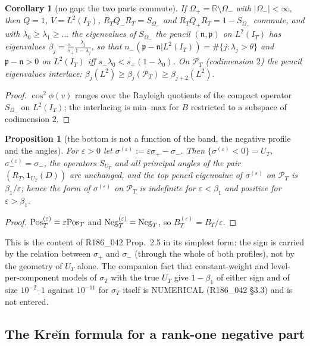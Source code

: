 \documentclass[11pt]{amsart}
\newtheorem{proposition}[theorem]{Proposition}
\newtheorem{corollary}[theorem]{Corollary}
\theoremstyle{definition}
\theoremstyle{remark}
\newcommand{\R}{\mathbb R}
\newcommand{\PT}{\mathcal P_T}
\newcommand{\IT}{I_T}
\newcommand{\sT}{\sigma_T}
\begin{document}
\begin{corollary}[no gap: the two parts commute]\label{cor:wh-nogap}
If $\Omega_+=\R\setminus\Omega_-$ with $|\Omega_-|<\infty$, then $Q=1$, $V=L^2(\IT)$, $R_TQ_-R_T=S_{\Omega_-}$ and
$R_TQ_+R_T=1-S_{\Omega_-}$ commute, and with $\lambda_0\ge\lambda_1\ge\dots$ the eigenvalues of $S_{\Omega_-}$ the pencil
$(\mathfrak n,\mathfrak p)$ on $L^2(\IT)$ has eigenvalues $\beta_j=\frac{s_-}{s_+}\frac{\lambda_j}{1-\lambda_j}$, so that
$n_-(\mathfrak p-\mathfrak n|L^2(\IT))=\#\{j:\lambda_j>\theta\}$ and $\mathfrak p-\mathfrak n>0$ on $L^2(\IT)$ iff
$s_-\lambda_0<s_+(1-\lambda_0)$. On $\PT$ (codimension $2$) the pencil eigenvalues interlace:
$\beta_j(L^2)\ge\beta_j(\PT)\ge\beta_{j+2}(L^2)$.
\end{corollary}
\begin{proof}
$\cos^2\phi(v)$ ranges over the Rayleigh quotients of the compact operator $S_{\Omega_-}$ on $L^2(\IT)$; the
interlacing is min--max for $B$ restricted to a subspace of codimension $2$.
\end{proof}

\begin{proposition}[the bottom is not a function of the band, the negative profile and the angles]\label{prop:wh-notangles}
For $\varepsilon>0$ let $\sigma^{(\varepsilon)}:=\varepsilon\sigma_+-\sigma_-$. Then $\{\sigma^{(\varepsilon)}<0\}=U_T$,
$\sigma^{(\varepsilon)}_-=\sigma_-$, the operators $S_{U_T}$ and all principal angles of the pair $(R_T,\mathbf 1_{U_T}(D))$
are unchanged, and the top pencil eigenvalue of $\sigma^{(\varepsilon)}$ on $\PT$ is $\beta_1/\varepsilon$; hence the
form of $\sigma^{(\varepsilon)}$ on $\PT$ is indefinite for $\varepsilon<\beta_1$ and positive for $\varepsilon>\beta_1$.
\end{proposition}
\begin{proof}
$\mathrm{Pos}_T^{(\varepsilon)}=\varepsilon\mathrm{Pos}_T$ and $\mathrm{Neg}_T^{(\varepsilon)}=\mathrm{Neg}_T$, so $B^{(\varepsilon)}_T=B_T/\varepsilon$.
\end{proof}
This is the content of R186\_042 Prop.~2.5 in its simplest form: the sign is carried by the relation
between $\sigma_+$ and $\sigma_-$ (through the whole of both profiles), not by the geometry of
$U_T$ alone. The companion fact that constant-weight and level-per-component models of $\sT$ with the
true $U_T$ give $1-\beta_1$ of either sign and of size $10^{-2}$--$1$ against $10^{-11}$ for $\sT$ itself
is NUMERICAL (R186\_042 \S3.3) and is not entered.

\subsection{The Kre\u{\i}n formula for a rank-one negative part}\label{subsec:wh-krein}
\end{document}
